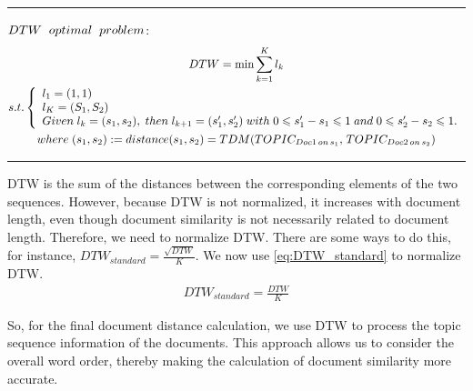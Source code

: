 \documentclass[UTF8]{ctexart}
\begin{document}
{    \noindent \rule{\linewidth}{0.2mm}
    \noindent $DTW \hspace{0.2cm} optimal \hspace{0.2cm} problem$:
    \begin{gather}
        DTW = \min \sum_{k = 1}^{K} l_{k} \label{eq:DTW} \\
        s.t. 
        \left\{
        \begin{array}{ll}
            l_{1} = (1,1) \\
            l_{K} = (S_1,S_2) \\
            Given \hspace{0.1cm} l_{k} = (s_1, s_2), \hspace{0.1cm} then \hspace{0.1cm} l_{k + 1} = (s_1', s_2') \hspace{0.1cm} with \hspace{0.1cm} 0 \leqslant s_1' - s_1 \leqslant 1 \hspace{0.1cm} and \hspace{0.1cm} 0 \leqslant s_2' - s_2 \leqslant 1.
        \end{array}
        \right. \\
        where \hspace{0.1cm} (s_1, s_2) := distance(s_1, s_2) = TDM(TOPIC_{Doc1 \hspace{0.05cm} on \hspace{0.05cm} s_1}, \hspace{0.05cm} TOPIC_{Doc2 \hspace{0.05cm} on \hspace{0.05cm} s_2}) \label{eq:DTW_distance}
    \end{gather}
    \noindent \rule{\linewidth}{0.2mm}

    DTW is the sum of the distances between the corresponding elements of the two sequences. 
    However, because DTW is not normalized, it increases with document length, 
    even though document similarity is not necessarily related to document length. 
    Therefore, we need to normalize DTW. There are some ways to do this, for instance, $DTW_{standard} = \frac{\sqrt{DTW}}{K}$.
    We now use \eqref{eq:DTW_standard} to normalize DTW.
    \begin{gather}
        DTW_{standard} = \frac{DTW}{K} \label{eq:DTW_standard}
    \end{gather}

    So, for the final document distance calculation, 
    we use DTW to process the topic sequence information of the documents. 
    This approach allows us to consider the overall word order, 
    thereby making the calculation of document similarity more accurate.
}
\end{document}
